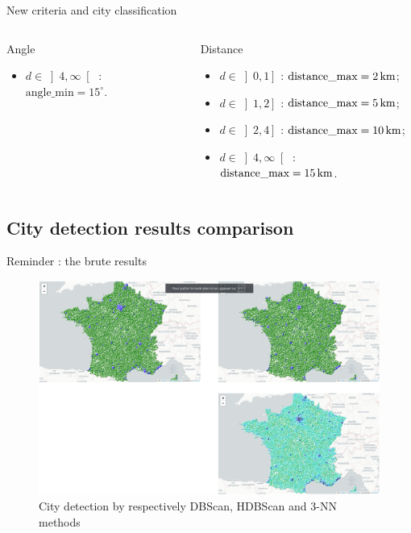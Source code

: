 \begin{frame}{New criteria and city classification}
\begin{columns}
\begin{column}{0.4\paperwidth}
\begin{block}{Angle}
\begin{itemize}
                    \item $d\in\left]4, \infty\right[$ : $\text{angle\_min}=15^\circ$.
                \end{itemize}
            \end{block}
        \end{column}
        \begin{column}{0.4\paperwidth}
            \begin{block}{Distance}
                \begin{itemize}
                    \item $d\in\left]0, 1\right]$ : $\text{distance\_max}=\unit[2]{km}$;
                    \item $d\in\left]1, 2\right]$ : $\text{distance\_max}=\unit[5]{km}$;
                    \item $d\in\left]2, 4\right]$ : $\text{distance\_max}=\unit[10]{km}$;
                    \item $d\in\left]4, \infty\right[$ : $\text{distance\_max}=\unit[15]{km}$.
                \end{itemize}
            \end{block}
        \end{column}
    \end{columns}
\end{frame}


\subsection{City detection results comparison}
\insertsubsectionframe

\begin{frame}{Reminder : the brute results}
    \begin{figure}
        \includegraphics[height=0.6\paperheight]{images/city-detection.png}
        \caption{\label{fig:city-detection}City detection by respectively DBScan, HDBScan and 3-NN methods}
    \end{figure}
\end{frame}

